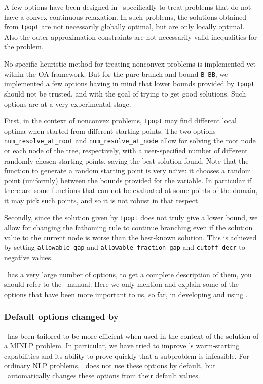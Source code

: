 A few options have been designed in \Bonmin\ specifically to treat
problems that do not have a convex continuous relaxation.
In such problems, the solutions obtained from {\tt Ipopt} are
not necessarily globally optimal, but are only locally optimal. Also the outer-approximation
constraints are not necessarily valid inequalities for the problem.

No specific heuristic method for treating nonconvex problems is implemented
yet within the OA framework.
But for the pure branch-and-bound {\tt B-BB}, we implemented a few options having
in mind that lower bounds provided by {\tt Ipopt} should not be trusted, and with the goal of
trying to get good solutions. Such options are at a very experimental stage.

First, in the context of nonconvex problems, {\tt Ipopt} may find different local optima when started
from different starting points. The two options {\tt num\_re\-solve\_at\_root} and {\tt num\_resolve\_at\_node}
allow for solving the root node or each node of the tree, respectively, with a user-specified
number of different randomly-chosen
starting points, saving the best solution found. Note that the function to generate a random starting point
is very na\"{\i}ve: it chooses a random point (uniformly) between the bounds provided for the variable.
In particular if there are some functions
that can not be evaluated at some points of the domain, it may pick such points,
 and so it is not robust in that respect.

Secondly, since the solution given by {\tt Ipopt} does not truly give a lower bound, we allow for
changing the fathoming rule
to continue branching even if the solution value to the current node is worse
than the best-known
solution. This is achieved by setting {\tt allowable\_gap}
and {\tt allowable\_fraction\_gap} and {\tt cutoff\_decr} to negative values.

\label{sec:opt_ipopt}
\Ipopt\ has a very large number of options, to get a complete description of them, you
should refer to the \Ipopt\ manual.
Here we only mention and explain some of the options that have been more important to us, so far,
in developing and using \Bonmin.
\subsubsection{Default options changed by \Bonmin}
\Ipopt\ has been tailored to be more efficient when used in the context of the
solution of a MINLP problem. In particular, we have tried to
improve \Ipopt's warm-starting capabilities and its ability to prove quickly that a subproblem
is infeasible. For ordinary NLP problems, \Ipopt\ does not use these options
by default, but \Bonmin\ automatically changes these options from their default values.

